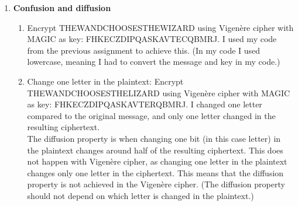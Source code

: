 \documentclass{article}
\begin{document}
	\homeworktitle
	
	\begin{enumerate}[label=\textbf{Task \arabic*:}]
		\item \textbf{Confusion and diffusion}
		\begin{enumerate}[label=\textit{Part \roman*:}]
			\item Encrypt \textsc{THEWANDCHOOSESTHEWIZARD} using Vigenère cipher with \textsc{MAGIC} as key: \textsc{FHKECZDIPQASKAVTECQBMRJ}. I used my code from the previous assignment to achieve this. (In my code I used lowercase, meaning I had to convert the message and key in my code.)
			
			\item Change one letter in the plaintext: Encrypt \textsc{THEWANDCHOOSESTHELIZARD} using Vigenère cipher with \textsc{MAGIC} as key: \textsc{FHKECZDIPQASKAVTERQBMRJ}. I changed one letter compared to the original message, and only one letter changed in the resulting ciphertext.\\
			The diffusion property is when changing one bit (in this case letter) in the plaintext changes around half of the resulting ciphertext. This does not happen with Vigenère cipher, as changing one letter in the plaintext changes only one letter in the ciphertext. This means that the diffusion property is not achieved in the Vigenère cipher. (The diffusion property should not depend on which letter is changed in the plaintext.)
			

\end{enumerate}
\end{enumerate}
\end{document}
